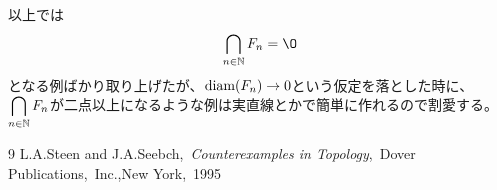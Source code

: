 \documentclass[leqno]{jsarticle}
\newcommand{\nn}{\mathbb{N}}
\newcommand{\dpst}{\displaystyle}
\newcommand{\dm}{\text{{\rm diam}}}
\begin{document}
以上では
\[
\dpst \bigcap_{n\in \nn}F_n=\O
\]
となる例ばかり取り上げたが、$\dm(F_n)\to 0$という仮定を落とした時に、$\dpst \dpst \bigcap_{n\in \nn}F_n$が二点以上になるような例は実直線とかで簡単に作れるので割愛する。































\begin{thebibliography}{9}
L.A.Steen and J.A.Seebch,\ {\it Counterexamples in Topology},\ Dover Publications,\ Inc.,New York,\ 1995
\end{thebibliography}



			
\end{document}
